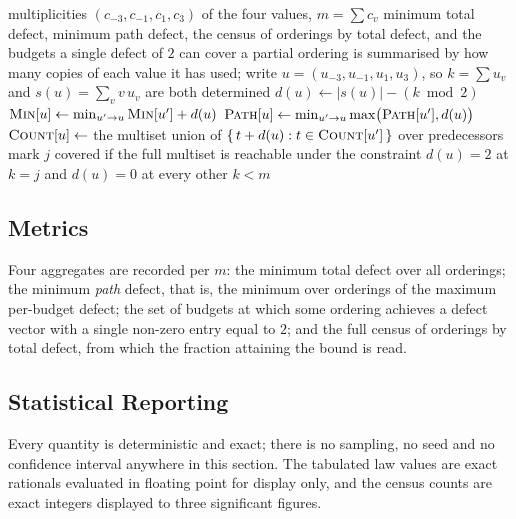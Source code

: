 \documentclass[conference]{IEEEtran}
\theoremstyle{definition}
\begin{document}
\begin{algorithm}[htbp]
\caption{Exhaustive defect statistics without enumerating orderings}
\label{alg:dp}
\begin{algorithmic}[1]
\REQUIRE multiplicities $(c_{-3},c_{-1},c_{1},c_{3})$ of the four values, $m=\sum c_{v}$
\ENSURE minimum total defect, minimum path defect, the census of orderings by total
        defect, and the budgets a single defect of $2$ can cover
\STATE a partial ordering is summarised by how many copies of each value it has used;
       write $u=(u_{-3},u_{-1},u_{1},u_{3})$, so $k=\sum u_{v}$ and
       $s(u)=\sum_{v} v\,u_{v}$ are both determined
\STATE $d(u)\leftarrow|s(u)|-(k\bmod 2)$ 
  \STATE $\textsc{Min}[u]\leftarrow\min_{u'\to u}\textsc{Min}[u']+d(u)$
  \STATE $\textsc{Path}[u]\leftarrow\min_{u'\to u}\max\bigl(\textsc{Path}[u'],d(u)\bigr)$
  \STATE $\textsc{Count}[u]\leftarrow$ the multiset union of
         $\{\,t+d(u):t\in\textsc{Count}[u']\,\}$ over predecessors
\ENDFOR
{}
  \STATE mark $j$ covered if the full multiset is reachable under the constraint
         $d(u)=2$ at $k=j$ and $d(u)=0$ at every other $k<m$
\ENDFOR
\end{algorithmic}
\end{algorithm}

\subsection{Metrics}

Four aggregates are recorded per $m$: the minimum total defect over all orderings; the
minimum \emph{path} defect, that is, the minimum over orderings of the maximum per-budget
defect; the set of budgets at which some ordering achieves a defect vector with a single
non-zero entry equal to $2$; and the full census of orderings by total defect, from which the
fraction attaining the bound is read.

\subsection{Statistical Reporting}

Every quantity is deterministic and exact; there is no sampling, no seed and no confidence
interval anywhere in this section. The tabulated law values are exact rationals evaluated in
floating point for display only, and the census counts are exact integers displayed to three
significant figures.
\end{document}
